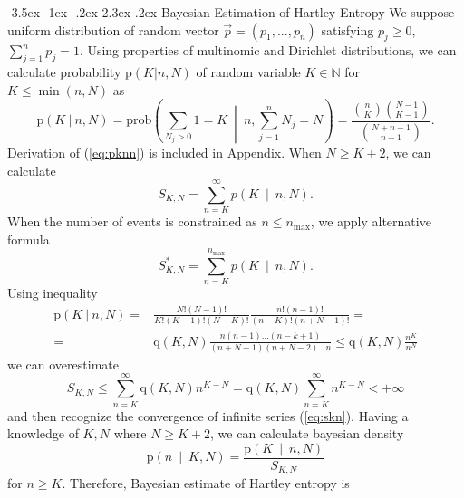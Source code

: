 \documentclass[a4paper,10pt]{article}
\makeatletter
\renewcommand\section{\@startsection {section}{1}{\z@}%
                                   {-3.5ex \@plus -1ex \@minus -.2ex}%
                                   {2.3ex \@plus.2ex}%
                                   {\large\bfseries}}
\makeatother
\begin{document}
\section {Bayesian Estimation of Hartley Entropy}
We suppose uniform distribution of random vector $\vec{p} = (p_{1},...,p_{n})$ satisfying  $p_{j} \ge 0$, $\sum_{j=1}^{n} p_{j} = 1$. Using properties of multinomic and Dirichlet distributions, we can calculate probability $\text{p}(K|n,N)$ of random variable $K \in \mathbb{N}$ for $K \le \min(n,N)$ as 
\begin{equation} 
\label{eq:pknn}
\text{p}(K \: | \: n,N) = \text{prob}\left(\sum_{N_{j} > 0}{1}=K \: \middle| \: n,\sum_{j=1}^{n}{N_{j}}=N\right) = \frac{{n \choose K}{N-1 \choose K-1}}{{N+n-1 \choose n-1}}.
\end{equation}
Derivation of (\ref{eq:pknn}) is included in Appendix. When $N \ge K+2$, we can calculate 
\begin{equation} 
\label{eq:skn}
S_{K,N} = \sum_{n=K}^{\infty}{p\left(K \: \middle| \: n,N\right)}.
\end{equation}
When the number of events is constrained as $n \leq n_{\text{max}} $, we apply alternative formula
\begin{equation} 
\label{eq:sknalt}
S_{K,N}^{*} = \sum_{n=K}^{n_{\text{max}}}{p\left(K \: \middle| \: n,N\right)}.
\end{equation}
Using inequality
\begin{equation} 
\label{eq:pknnplus}
\begin{split}
\text{p}(K \: | \: n,N) = & \frac{N!(N-1)!}{K!(K-1)!(N-K)!} \frac{n!(n-1)!}{(n-K)!(n+N-1)!} = \\ = & \text{q}(K,N) \frac{n(n-1)...(n-k+1)}{(n+N-1)(n+N-2)...n} \le \text{q}(K,N)\frac{n^K}{n^N}
\end{split}
\end{equation}
we can overestimate
\begin{equation} 
\label{eq:sknover}
S_{K,N} \le \sum_{n=K}^{\infty}{\text{q}(K,N)n^{K-N}} = \text{q}(K,N)\sum_{n=K}^{\infty}{n^{K-N}} < +\infty
\end{equation}
and then recognize the convergence of infinite series (\ref{eq:skn}). Having a knowledge of $K,N$ where $N \ge K+2$, we can calculate bayesian density
\begin{equation} 
\label{eq:pnkn}
\text{p}\left(n \: \middle| \: K,N \right) = \frac{\text{p}\left(K \: \middle| \: n,N\right)}{S_{K,N}}
\end{equation}
for $n \ge K$.
Therefore, Bayesian estimate of Hartley entropy is
\end{document}
